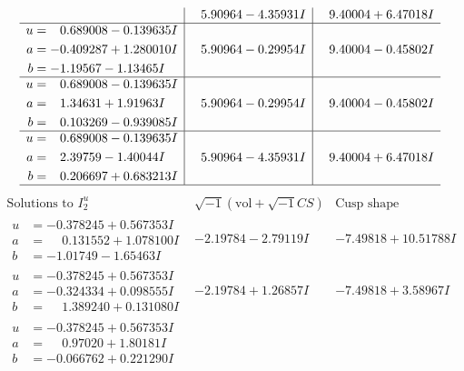 \documentclass[1p]{elsarticle_modified}
\theoremstyle{definition}
\newcommand{\I}{\sqrt{-1}}
\begin{document}
$$\begin{array}{c|c|c}
 & \phantom{-}5.90964 - 4.35931 I & \phantom{-}9.40004 + 6.47018 I \\ \hline\begin{aligned}
u &= \phantom{-}0.689008 - 0.139635 I \\
a &= -0.409287 + 1.280010 I \\
b &= -1.19567 - 1.13465 I\end{aligned}
 & \phantom{-}5.90964 - 0.29954 I & \phantom{-}9.40004 - 0.45802 I \\ \hline\begin{aligned}
u &= \phantom{-}0.689008 - 0.139635 I \\
a &= \phantom{-}1.34631 + 1.91963 I \\
b &= \phantom{-}0.103269 - 0.939085 I\end{aligned}
 & \phantom{-}5.90964 - 0.29954 I & \phantom{-}9.40004 - 0.45802 I \\ \hline\begin{aligned}
u &= \phantom{-}0.689008 - 0.139635 I \\
a &= \phantom{-}2.39759 - 1.40044 I \\
b &= \phantom{-}0.206697 + 0.683213 I\end{aligned}
 & \phantom{-}5.90964 - 4.35931 I & \phantom{-}9.40004 + 6.47018 I\\
 \hline 
 \end{array}$$\newpage$$\begin{array}{c|c|c}  
\text{Solutions to }I^u_{2}& \I (\text{vol} + \sqrt{-1}CS) & \text{Cusp shape}\\
 \hline 
\begin{aligned}
u &= -0.378245 + 0.567353 I \\
a &= \phantom{-}0.131552 + 1.078100 I \\
b &= -1.01749 - 1.65463 I\end{aligned}
 & -2.19784 - 2.79119 I & -7.49818 + 10.51788 I \\ \hline\begin{aligned}
u &= -0.378245 + 0.567353 I \\
a &= -0.324334 + 0.098555 I \\
b &= \phantom{-}1.389240 + 0.131080 I\end{aligned}
 & -2.19784 + 1.26857 I & -7.49818 + 3.58967 I \\ \hline\begin{aligned}
u &= -0.378245 + 0.567353 I \\
a &= \phantom{-}0.97020 + 1.80181 I \\
b &= -0.066762 + 0.221290 I\end{aligned}

\end{array}$$
\end{document}

